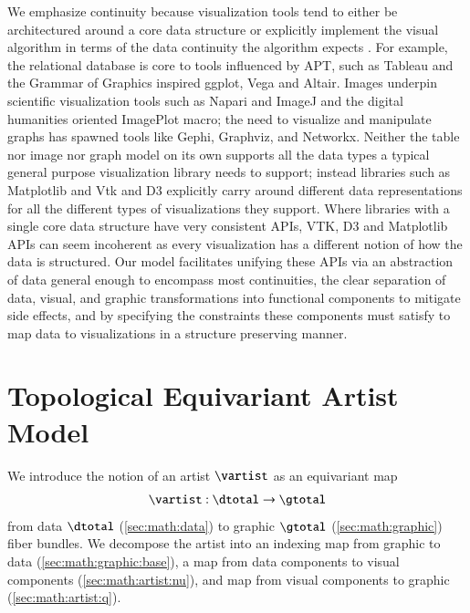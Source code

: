 \documentclass[journal]{vgtc}                %
\begin{document}
We emphasize continuity because visualization tools tend to either be architectured around a core data structure\cite{HeerSoftware2006} or explicitly implement the visual algorithm in terms of the data continuity the algorithm expects \cite{toryRethinkingVisualizationHighlevel2004}. For example, the relational database is core to tools influenced by APT, such as Tableau\cite{StoltePolaris2002,hanrahanVizQL2006,MackinlayShowme2007} and the Grammar of Graphics\cite{wilkinsonGrammarGraphics2005} inspired ggplot\cite{wickhamGgplot2ElegantGraphics2016a}, Vega\cite{satyanarayanDeclarativeInteractionDesign2014} and Altair\cite{vanderplasAltairInteractiveStatistical2018}. Images underpin scientific visualization tools such as Napari\cite{nicholas_sofroniew_2021_4533308} and ImageJ\cite{schneiderNIHImageImageJ2012} and the digital humanities oriented ImagePlot\cite{studiesCulturevisImageplot2021} macro; the need to visualize and manipulate graphs has spawned tools like Gephi\cite{bastianGephiOpenSource2009}, Graphviz\cite{ellsonGraphvizOpenSource2002}, and Networkx\cite{HagbergExploringNetwork2008}. Neither the table nor image nor graph model on its own supports all the data types a typical general purpose visualization library needs to support; instead libraries such as Matplotlib\cite{hunterMatplotlib2DGraphics2007} and Vtk\cite{hanwellVisualizationToolkitVTK2015, geveci2012vtk} and D3 \cite{bostockDataDrivenDocuments2011} explicitly carry around different data representations for all the different types of visualizations they support.  Where libraries with a single core data structure have very consistent APIs, VTK, D3 and Matplotlib APIs can seem incoherent as every visualization has a different notion of how the data is structured. Our model facilitates unifying these APIs via an abstraction of data general enough to encompass most continuities, the clear separation of data, visual, and graphic transformations into functional components to mitigate side effects, and by specifying the constraints these components must satisfy to map data to visualizations in a structure preserving manner. 


\section{Topological Equivariant Artist Model}
\label{sec:math}
We introduce the notion of an artist $\mathscr{\vartist}$ as an equivariant map
\begin{equation}
    \label{eq:artist}
    \mathscr{\vartist}: \mathscr{\dtotal} \rightarrow \mathscr{\gtotal}
\end{equation}
from data $\mathscr{\dtotal}$ (\autoref{sec:math:data}) to graphic $\mathscr{\gtotal}$ (\autoref{sec:math:graphic}) fiber bundles. We decompose the artist into an indexing map from graphic to data (\autoref{sec:math:graphic:base}), a map from data components to visual components (\autoref{sec:math:artist:nu}), and map from visual components to graphic (\autoref{sec:math:artist:q}).
\end{document}
